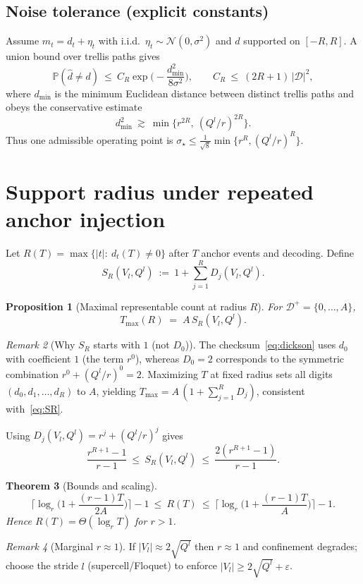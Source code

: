 \documentclass[11pt]{article}
\newtheorem{theorem}{Theorem}[section]
\newtheorem{proposition}[theorem]{Proposition}
\theoremstyle{definition}
\theoremstyle{remark}
\newtheorem{remark}[theorem]{Remark}
\begin{document}
\subsection{Noise tolerance (explicit constants)}\label{subsec:noise}
Assume $m_t=d_t+\eta_t$ with i.i.d.\ $\eta_t\sim\mathcal N(0,\sigma^2)$ and $d$ supported on $[-R,R]$.
A union bound over trellis paths gives
\begin{equation}\label{eq:sigmastar}
\mathbb P(\hat d \neq d) \ \le\ C_R \exp\!\Big(-\frac{d_{\min}^2}{8\sigma^2}\Big),
\qquad C_R \ \le\ (2R{+}1)\,|\mathcal D|^2,
\end{equation}
where $d_{\min}$ is the minimum Euclidean distance between distinct trellis paths and obeys the conservative estimate
\begin{equation}
d_{\min}^2 \ \gtrsim\ \min\{ r^{2R},\ (Q^l/r)^{2R}\}.
\end{equation}
Thus one admissible operating point is $\sigma_\star \le \frac{1}{\sqrt 8}\min\{ r^{R}, (Q^l/r)^{R}\}$.

\section{Support radius under repeated anchor injection}
Let $R(T)=\max\{|t|:\ d_t(T)\neq 0\}$ after $T$ anchor events and decoding.
Define
\begin{equation}\label{eq:SR}
S_R(V_l,Q^l)\ :=\ 1+\sum_{j=1}^{R} D_j(V_l,Q^l).
\end{equation}
\begin{proposition}[Maximal representable count at radius $R$]\label{prop:Tmax}
For $\mathcal D^+=\{0,\dots,A\}$,
\begin{equation}\label{eq:Tmax}
T_{\max}(R)\;=\; A\,S_R(V_l,Q^l).
\end{equation}
\end{proposition}
\begin{remark}[Why $S_R$ starts with $1$ (not $D_0$)]
The checksum~\eqref{eq:dickson} uses $d_0$ with coefficient $1$ (the term $r^0$), whereas $D_0=2$ corresponds to the symmetric combination $r^0 + (Q^l/r)^0=2$.
Maximizing $T$ at fixed radius sets all digits $(d_0,d_1,\dots,d_R)$ to $A$, yielding
$T_{\max}=A\,(1+\sum_{j=1}^{R} D_j)$, consistent with~\eqref{eq:SR}.
\end{remark}
Using $D_j(V_l,Q^l)=r^j+(Q^l/r)^j$ gives
\begin{equation}
\frac{r^{R+1}-1}{r-1}\ \le\ S_R(V_l,Q^l)\ \le\ \frac{2(r^{R+1}-1)}{r-1}.
\end{equation}
\begin{theorem}[Bounds and scaling]\label{thm:Rbounds}
\begin{equation}\label{eq:Rbounds}
\Big\lceil \log_r\!\Big(1+\frac{(r-1)T}{2A}\Big)\Big\rceil -1 \ \le\ R(T)\ \le\
\Big\lceil \log_r\!\Big(1+\frac{(r-1)T}{A}\Big)\Big\rceil -1.
\end{equation}
Hence $R(T)=\Theta(\log_r T)$ for $r>1$.
\end{theorem}
\begin{remark}[Marginal $r\approx 1$]
If $|V_l|\approx 2\sqrt{Q^l}$ then $r\approx 1$ and confinement degrades; choose the stride $l$ (supercell/Floquet) to enforce $|V_l|\ge 2\sqrt{Q^l}+\varepsilon$.
\end{remark}
\end{document}
